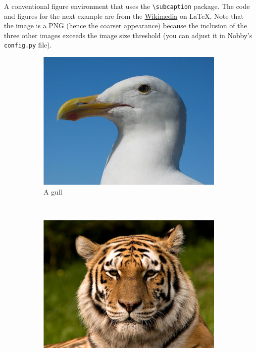 \documentclass[10pt]{article}
\begin{document}
A conventional figure environment that uses the
\texttt{\textbackslash{subcaption}} package. The code and figures for
the next example are from the
\href{http://en.wikibooks.org/wiki/LaTeX/Floats,_Figures_and_Captions}{Wikimedia}
on \LaTeX. Note that the image is a PNG (hence the coarser appearance)
because the inclusion of the three other images exceeds the image size
threshold (you can adjust it in Nobby's \texttt{config.py} file).\\
\begin{figure}
  \centering
  \begin{subfigure}[b]{0.3\textwidth}
    \includegraphics[width=\textwidth]{gull}
    \caption{A gull}
    \label{fig:gull}
  \end{subfigure}%
  ~ %
  \begin{subfigure}[b]{0.3\textwidth}
    \includegraphics[width=\textwidth]{tiger}

\end{subfigure}
\end{figure}
\end{document}
